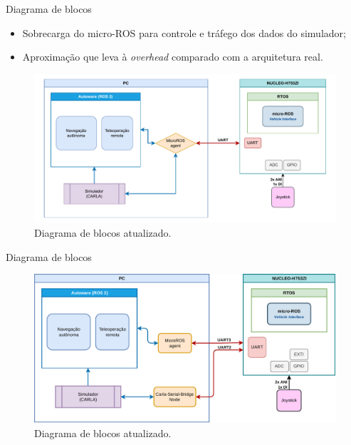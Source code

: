 \documentclass{if-beamer}
\begin{document}
\begin{frame}{Diagrama de blocos}
	
	\begin{block}{}
		
		\begin{itemize}
			\item Sobrecarga do micro-ROS para controle e tráfego dos dados do simulador;
			\item Aproximação que leva à \textit{overhead} comparado com a arquitetura real.
			
		\end{itemize}
		
	\end{block}
	
	\begin{figure}[H]
		\centering
		\includegraphics[width=0.75\linewidth]{block_diagram_old}
		\caption{Diagrama de blocos atualizado.}
		\label{fig:block_diagram_old}
	\end{figure}
	
\end{frame}

\begin{frame}{Diagrama de blocos}
	
	\begin{figure}[H]
		\centering
		\includegraphics[width=0.9\linewidth]{block_diagram}
		\caption{Diagrama de blocos atualizado.}
		\label{fig:block_diagram}
	\end{figure}

\end{frame}
\end{document}

